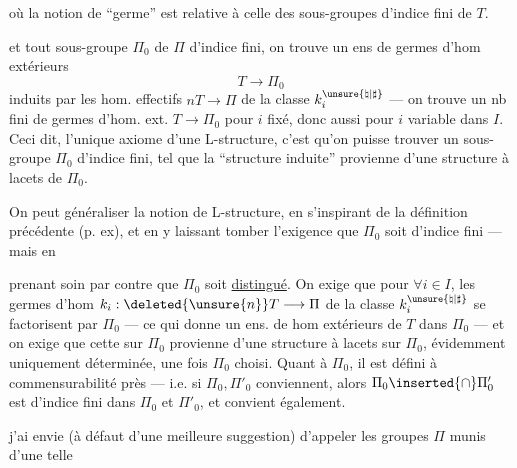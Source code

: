 où la notion de ``germe'' est relative à celle des sous-groupes d'indice fini de $T$.  


et tout sous-groupe  $\Pi_0$ de $\Pi$ d'indice fini, on trouve  un ens de germes d'hom extérieurs
\[
T\longrightarrow\Pi_0
\]
induits par les hom.  effectifs $nT\longrightarrow\Pi$ de la classe $k_i^{\unsure{\natural|\sharp}}$ --- on trouve un nb fini de germes d'hom. ext. $T\longrightarrow\Pi_0$ pour $i$ fixé, donc aussi pour $i$ variable dans $I$. Ceci dit, l'unique axiome d'une L-structure, c'est qu'on puisse trouver un sous-groupe $\Pi_0$ d'indice fini, tel que la ``structure induite'' provienne d'une structure à lacets de $\Pi_0$.

On peut généraliser la notion de L-structure, en s'inspirant de la définition précédente (p. ex), et en y laissant tomber l'exigence que $\Pi_0$ soit d'indice fini --- mais en


prenant soin par contre que $\Pi_0$ soit \uline{distingué}. On exige que  pour $\forall i\in I$, les germes d'hom $k_i:\deleted{\unsure{n}}T\longrightarrow\Pi$ de la classe $k_i^{\unsure{\natural|\sharp}}$ se factorisent par $\Pi_0$ --- ce qui donne un ens. de hom extérieurs de $T$ dans $\Pi_0$ ---
et on exige que cette   sur $\Pi_0$ provienne  d'une structure à lacets sur $\Pi_0$, \unsure{$\xi$|\&} évidemment uniquement déterminée, une fois $\Pi_0$ choisi. Quant à $\Pi_0$, il est défini à commensurabilité près --- i.e. si $\Pi_0,\Pi'_0$ conviennent, alors $\Pi_0\inserted{\cap}\Pi'_0$ est d'indice fini dans $\Pi_0$ et $\Pi'_0$, et convient également.

 j'ai envie (à défaut d'une meilleure suggestion) d'appeler les groupes $\Pi$ munis d'une telle
